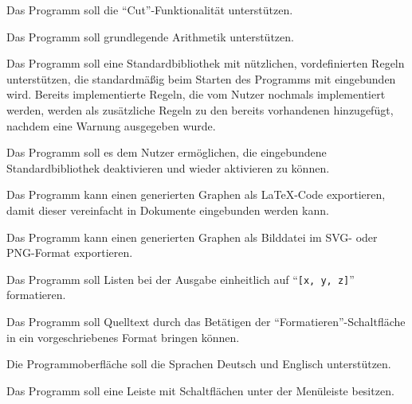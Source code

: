 \documentclass[parskip=full,11pt,twoside]{scrartcl}
\begin{document}

Das Programm soll die \enquote{Cut}-Funktionalität unterstützen.


Das Programm soll grundlegende Arithmetik unterstützen.


Das Programm soll eine Standardbibliothek mit nützlichen, vordefinierten Regeln unterstützen, die standardmäßig beim Starten des Programms mit eingebunden wird. Bereits implementierte Regeln, die vom Nutzer nochmals implementiert werden, werden als zusätzliche Regeln zu den bereits vorhandenen hinzugefügt, nachdem eine Warnung ausgegeben wurde.


Das Programm soll es dem Nutzer ermöglichen, die eingebundene Standardbibliothek deaktivieren und wieder aktivieren zu können.


Das Programm kann einen generierten Graphen als LaTeX-Code exportieren, damit dieser vereinfacht in Dokumente eingebunden werden kann.


Das Programm kann einen generierten Graphen als Bilddatei im SVG- oder PNG-Format exportieren.


Das Programm soll Listen bei der Ausgabe einheitlich auf \enquote{\texttt{[x, y, z]}} formatieren.


Das Programm soll Quelltext durch das Betätigen der \enquote{Formatieren}-Schaltfläche in ein vorgeschriebenes Format bringen können.


Die Programmoberfläche soll die Sprachen Deutsch und Englisch unterstützen.


Das Programm soll eine Leiste mit Schaltflächen unter der Menüleiste besitzen.
\end{document}
